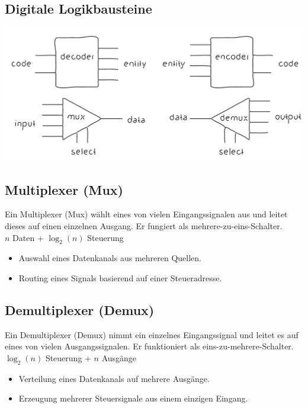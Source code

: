 \documentclass[a4paper,6pt]{article}
\begin{document}
\begin{multicols*}{3}
\section{Digitale Logikbausteine}

\begin{center}
    \includegraphics[width=1\linewidth]{resources/Logikbausteine.png}
\end{center}
    

\subsection*{Multiplexer (Mux)}
Ein Multiplexer (Mux) wählt eines von vielen Eingangssignalen aus und leitet dieses auf einen einzelnen Ausgang. Er fungiert als mehrere-zu-eins-Schalter.\\
$ n $ Daten + $ \log_2(n) $ Steuerung
\begin{itemize}
    \item Auswahl eines Datenkanals aus mehreren Quellen.
    \item Routing eines Signals basierend auf einer Steueradresse.
\end{itemize}

\subsection*{Demultiplexer (Demux)}
Ein Demultiplexer (Demux) nimmt ein einzelnes Eingangssignal und leitet es auf eines von vielen Ausgangssignalen. Er funktioniert als eins-zu-mehrere-Schalter.\\
$ \log_2(n) $ Steuerung + $ n $ Ausgänge
\begin{itemize}
    \item Verteilung eines Datenkanals auf mehrere Ausgänge.
    \item Erzeugung mehrerer Steuersignale aus einem einzigen Eingang.
\end{itemize}


\end{multicols*}
\end{document}
